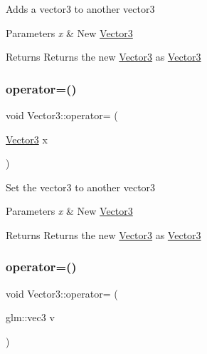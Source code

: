 Adds a vector3 to another vector3 
\begin{DoxyParams}{Parameters}
{\em x} & New \mbox{\hyperlink{struct_vector3}{Vector3}} \\
\hline
\end{DoxyParams}
\begin{DoxyReturn}{Returns}
Returns the new \mbox{\hyperlink{struct_vector3}{Vector3}} as \mbox{\hyperlink{struct_vector3}{Vector3}} 
\end{DoxyReturn}
\mbox{\label{struct_vector3_a922a02c393dbe36e6299cb5a1fe458ac}} 
\subsubsection{\texorpdfstring{operator=()}{operator=()}\hspace{0.1cm}{\footnotesize\ttfamily [1/2]}}
{\footnotesize\ttfamily void Vector3\+::operator= (\begin{DoxyParamCaption}\item[{\mbox{\hyperlink{struct_vector3}{Vector3}}}]{x }\end{DoxyParamCaption})\hspace{0.3cm}{\ttfamily [inline]}}

Set the vector3 to another vector3 
\begin{DoxyParams}{Parameters}
{\em x} & New \mbox{\hyperlink{struct_vector3}{Vector3}} \\
\hline
\end{DoxyParams}
\begin{DoxyReturn}{Returns}
Returns the new \mbox{\hyperlink{struct_vector3}{Vector3}} as \mbox{\hyperlink{struct_vector3}{Vector3}} 
\end{DoxyReturn}
\mbox{\label{struct_vector3_a11cb73f45e746e16397d4a0496d107a5}} 
\subsubsection{\texorpdfstring{operator=()}{operator=()}\hspace{0.1cm}{\footnotesize\ttfamily [2/2]}}
{\footnotesize\ttfamily void Vector3\+::operator= (\begin{DoxyParamCaption}\item[{glm\+::vec3}]{v }\end{DoxyParamCaption})\hspace{0.3cm}{\ttfamily [inline]}}

